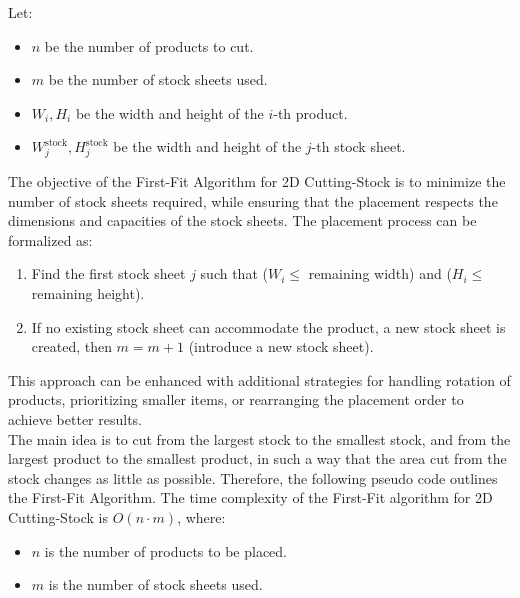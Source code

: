 \documentclass[a4paper]{article}
\begin{document}
    Let:
    \begin{itemize}
        \item \( n \) be the number of products to cut.
        \item \( m \) be the number of stock sheets used.
        \item \( W_i, H_i \) be the width and height of the \( i \)-th product.
        \item \( W_j^{\text{stock}}, H_j^{\text{stock}} \) be the width and height of the \( j \)-th stock sheet.
    \end{itemize}
    \vspace{0.2cm}
    The objective of the First-Fit Algorithm for 2D Cutting-Stock is to minimize the number of stock sheets required, while ensuring that the placement respects the dimensions and capacities of the stock sheets. The placement process can be formalized as:
    \begin{enumerate}
        \item Find the first stock sheet \(j\) such that (\(W_i \leq \) remaining width) and (\(H_i \leq\) remaining height).
        \item If no existing stock sheet can accommodate the product, a new stock sheet is created, then \(m = m + 1 \) (introduce a new stock sheet).
    \end{enumerate}    
    \vspace{0.2cm}
    This approach can be enhanced with additional strategies for handling rotation of products, prioritizing smaller items, or rearranging the placement order to achieve better results.
    \vspace{0.2cm}\\
    The main idea is to cut from the largest stock to the smallest stock, and from the largest product to the smallest product, in such a way that the area cut from the stock changes as little as possible. Therefore, the following pseudo code outlines the First-Fit Algorithm. The time complexity of the First-Fit algorithm for 2D Cutting-Stock is \( O(n \cdot m) \), where:
    \begin{itemize}
        \item \( n \) is the number of products to be placed.
        \item \( m \) is the number of stock sheets used.
    \end{itemize}
\end{document}

